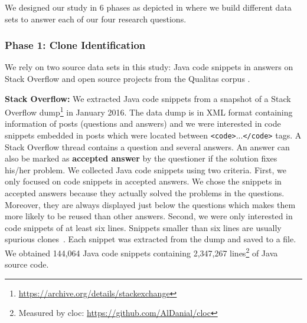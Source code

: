 \documentclass[sigconf,review, anonymous]{acmart}
\begin{document}
We designed our study in 6 phases as depicted in  where
we build different data sets to answer each of our four research
questions. 

\subsubsection{Phase 1: Clone Identification}

We rely on two source data sets in this study: Java code snippets in answers
on Stack Overflow and open source projects from the Qualitas corpus
\cite{QualitasCorpus}.

\textbf{Stack Overflow:} 
We extracted Java code snippets from a snapshot of a Stack Overflow
dump\footnote{\url{https://archive.org/details/stackexchange}} in
January 2016. 
The data
dump is in XML format containing information of posts
(questions and answers) and 
we were interested in code snippets embedded
in posts which were located between
{\small\texttt{<code>}...\texttt{</code>}} tags. A Stack Overflow
thread contains a question and several answers. An answer can also be
marked as \textbf{accepted answer} by the questioner if the solution
fixes his/her problem. We collected Java code snippets using two
criteria. First, we only focused on code snippets in accepted
answers. We chose the snippets in accepted answers because they
actually solved the problems in the questions. Moreover, they are
always displayed just below the questions which makes them more
likely to be reused than other answers. Second, we were only
interested in code snippets of at least six lines. Snippets smaller
than six lines are usually spurious clones~\cite{Bellon2007}. Each
snippet was extracted from the dump and saved to a file.
We obtained 144,064 Java code snippets containing 2,347,267
lines\footnote{Measured by cloc:
  \url{https://github.com/AlDanial/cloc}} of Java source code.
\end{document}
